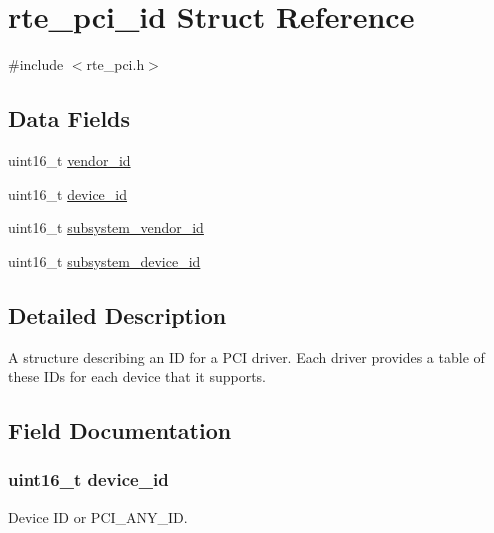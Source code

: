 \hypertarget{structrte__pci__id}{}\section{rte\+\_\+pci\+\_\+id Struct Reference}
\label{structrte__pci__id}


{\ttfamily \#include $<$rte\+\_\+pci.\+h$>$}

\subsection*{Data Fields}
\begin{DoxyCompactItemize}
\item 
uint16\+\_\+t \hyperlink{structrte__pci__id_abd60aba7846c925f784c3e89e2f54e45}{vendor\+\_\+id}
\item 
uint16\+\_\+t \hyperlink{structrte__pci__id_adc401e0e7465eda38f9444eeb6169a10}{device\+\_\+id}
\item 
uint16\+\_\+t \hyperlink{structrte__pci__id_a6acc9abcfadbfbf47d2269f323fc36b8}{subsystem\+\_\+vendor\+\_\+id}
\item 
uint16\+\_\+t \hyperlink{structrte__pci__id_a8a8b8a0ce1242424f0b4918890a0b6f7}{subsystem\+\_\+device\+\_\+id}
\end{DoxyCompactItemize}


\subsection{Detailed Description}
A structure describing an I\+D for a P\+C\+I driver. Each driver provides a table of these I\+Ds for each device that it supports. 

\subsection{Field Documentation}
\hypertarget{structrte__pci__id_adc401e0e7465eda38f9444eeb6169a10}{}
\subsubsection[{device\+\_\+id}]{\setlength{\rightskip}{0pt plus 5cm}uint16\+\_\+t device\+\_\+id}\label{structrte__pci__id_adc401e0e7465eda38f9444eeb6169a10}
Device I\+D or P\+C\+I\+\_\+\+A\+N\+Y\+\_\+\+I\+D. \hypertarget{structrte__pci__id_a8a8b8a0ce1242424f0b4918890a0b6f7}{}
